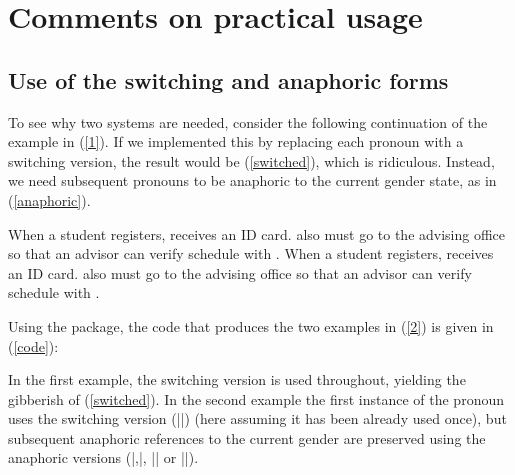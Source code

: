 \documentclass[11pt]{article}
\begin{document}
\section{Comments on practical usage}
\subsection{Use of the switching and anaphoric forms}
To see why two systems are needed, consider the following continuation of the example in (\ref{1}).  If we implemented this by replacing each pronoun with a switching version, the result would be (\ref{switched}), which is ridiculous. Instead, we need subsequent pronouns to be anaphoric to the current gender state, as in (\ref{anaphoric}).

\begin{exe}
\ex\label{2}
\begin{xlist}
\ex \hefalse When a student registers, \heshe receives an ID card. \Heshe also must go to the advising office so that an advisor can  verify \hisher schedule with \himher.\label{switched}
\ex When a student registers, \heshe receives an ID card. \He also must go to the advising office so that an advisor  can verify \his schedule with \him.\label{anaphoric}
\end{xlist}
\end{exe}

Using the package, the code that produces the two examples in (\ref{2}) is given in (\ref{code}):

\begin{exe}
\ex\label{code}
\end{exe}

In the first example, the switching version is used throughout, yielding the gibberish of (\ref{switched}). In the second example the first instance of the pronoun uses the switching version (|\heshe|) (here assuming it has been already used once), but subsequent anaphoric references to the current gender are preserved using the anaphoric versions (|\he,\him|, |\his| or |\hiss|).
\end{document}
